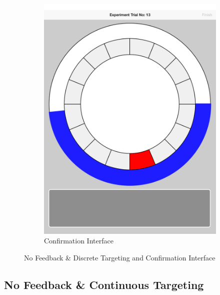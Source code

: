\begin{figure}[H]
\begin{subfigure}[b]{0.3\textwidth}
	\includegraphics[width=\textwidth]{figures/NFDConfirm.png}
	\caption{Confirmation Interface}
	\label{fig:NFDConfirm}
\end{subfigure}
\caption{No Feedback \& Discrete Targeting and Confirmation Interface}
\label{fig:NFDGraph}
\end{figure}

\subsection{No Feedback \& Continuous Targeting}

